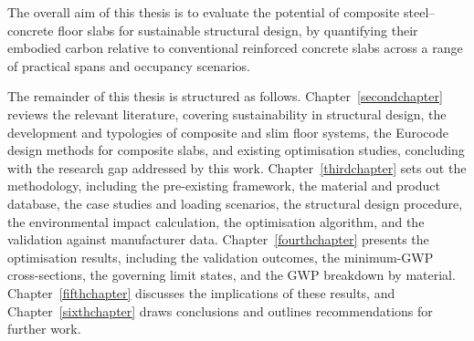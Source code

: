 The overall aim of this thesis is to evaluate the potential of composite steel--concrete floor slabs for sustainable structural design, by quantifying their embodied carbon relative to conventional reinforced concrete slabs across a range of practical spans and occupancy scenarios.



The remainder of this thesis is structured as follows. Chapter~\ref{secondchapter} reviews the relevant literature, covering sustainability in structural design, the development and typologies of composite and slim floor systems, the Eurocode design methods for composite slabs, and existing optimisation studies, concluding with the research gap addressed by this work. Chapter~\ref{thirdchapter} sets out the methodology, including the pre-existing framework, the material and product database, the case studies and loading scenarios, the structural design procedure, the environmental impact calculation, the optimisation algorithm, and the validation against manufacturer data. Chapter~\ref{fourthchapter} presents the optimisation results, including the validation outcomes, the minimum-GWP cross-sections, the governing limit states, and the GWP breakdown by material. Chapter~\ref{fifthchapter} discusses the implications of these results, and Chapter~\ref{sixthchapter} draws conclusions and outlines recommendations for further work.
